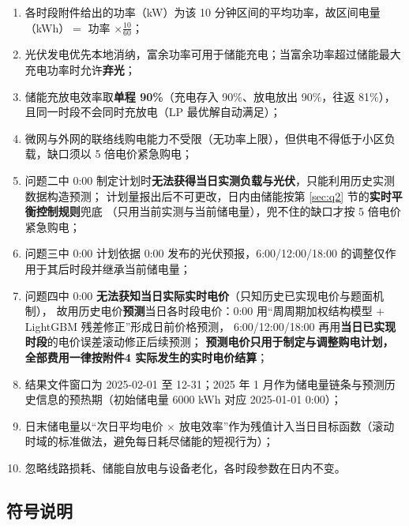 \documentclass[12pt,a4paper,fontset=fandol]{ctexart}
\begin{document}
\begin{enumerate}[label=\textbf{假设\arabic*.}, leftmargin=4.2em, itemsep=2pt]
\item 各时段附件给出的功率（kW\nobreak）为该 10 分钟区间的平均功率\nobreak，故区间电量（kWh\nobreak）$=$ 功率 $\times \frac{10}{60}$\nobreak；
\item 光伏发电优先本地消纳\nobreak，富余功率可用于储能充电\nobreak；当富余功率超过储能最大充电功率时允许\textbf{弃光}\nobreak；
\item 储能充放电效率取\textbf{单程 90\%}（充电存入 90\%\nobreak、放电放出 90\%\nobreak，往返 81\%\nobreak）\nobreak，且同一时段不会同时充放电（LP 最优解自动满足\nobreak）\nobreak；
\item 微网与外网的联络线购电能力不受限（无功率上限\nobreak）\nobreak，但供电不得低于小区负载\nobreak，缺口须以 5 倍电价紧急购电\nobreak；
\item 问题二中 0:00 制定计划时\textbf{无法获得当日实测负载与光伏}\nobreak，只能利用历史实测数据构造预测\nobreak；
计划量报出后不可更改\nobreak，日内由储能按第 \ref{sec:q2} 节的\textbf{实时平衡控制规则}兜底
（只用当前实测与当前储电量\nobreak）\nobreak，兜不住的缺口才按 5 倍电价紧急购电\nobreak；
\item 问题三中 0:00 计划依据 0:00 发布的光伏预报\nobreak，6:00/12:00/18:00 的调整仅作用于其后时段并继承当前储电量\nobreak；
\item 问题四中 0:00 \textbf{无法获知当日实际实时电价}（只知历史已实现电价与题面机制\nobreak）\nobreak，
故用历史电价\textbf{预测}当日各时段电价：0:00 用“周周期加权结构模型 + LightGBM 残差修正”形成日前价格预测\nobreak，
6:00/12:00/18:00 再用\textbf{当日已实现时段}的电价误差滚动修正后续预测\nobreak；
\textbf{预测电价只用于制定与调整购电计划\nobreak，全部费用一律按附件4 实际发生的实时电价结算}\nobreak；
\item 结果文件窗口为 2025-02-01 至 12-31\nobreak；2025 年 1 月作为储电量链条与预测历史信息的预热期（初始储电量 6000 kWh 对应 2025-01-01 0:00\nobreak）\nobreak；
\item 日末储电量以“次日平均电价 $\times$ 放电效率\nobreak”作为残值计入当日目标函数（滚动时域的标准做法\nobreak，避免每日耗尽储能的短视行为\nobreak）\nobreak；
\item 忽略线路损耗\nobreak、储能自放电与设备老化\nobreak，各时段参数在日内不变\nobreak。
\end{enumerate}

\subsection{符号说明}
\end{document}

